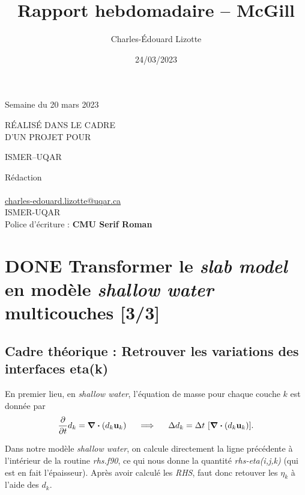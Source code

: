 \documentclass[10pt]{article}
\author{Charles-Édouard Lizotte}
\date{24/03/2023}
\title{Rapport hebdomadaire -- McGill}
\makeatletter
\numberwithin{equation}{section}
\newcommand{\mytitlepage}{
\begin{titlepage}
\begin{center}
{\Huge \thesubtitle \par}
\vspace{2cm}
{\Huge \MakeUppercase{\thetitle} \par}
\vspace{2cm}
RÉALISÉ DANS LE CADRE\\ D'UN PROJET POUR \par
\vspace{2cm}
{\Huge ISMER--UQAR \par}
\vspace{2cm}
{\thedate}
\end{center}
\vfill
Rédaction \\
{\theauthor}\\
\url{charles-edouard.lizotte@uqar.ca}\\
ISMER-UQAR\\
Police d'écriture : \textbf{CMU Serif Roman}
\end{titlepage}
}
\newcommand{\thesubtitle}{Semaine du 20 mars 2023}
\makeatother
\begin{document}
\mytitlepage
\tableofcontents\newpage

\section{{\bfseries\sffamily DONE} Transformer le \emph{slab model} en modèle \emph{shallow water} multicouches [3/3]}
\label{sec:org95a1470}
\subsection{\textbf{Cadre théorique} : Retrouver les variations des interfaces eta(k)}
\label{sec:orgda0501e}
En premier lieu, en \emph{shallow water}, l'équation de masse pour chaque couche \(k\) est donnée par
\begin{equation}
\pdv{}{t} d_k = \divergence (d_k\vb{u}_k)
\hspace{0.5cm}\Longrightarrow\hspace{0.5cm}
\Delta d_k = \Delta t \ \qty[ \divergence (d_k \vb{u}_k)].
\end{equation}

Dans notre modèle \emph{shallow water}, on calcule directement la ligne précédente à l'intérieur de la routine \emph{rhs.f90}, ce qui nous donne la quantité \emph{rhs-eta(i,j,k)} (qui est en fait l'épaisseur).
Après avoir calculé les \emph{RHS}, faut donc retouver les \(\eta_k\) à l'aide des \(d_k\).
\end{document}

